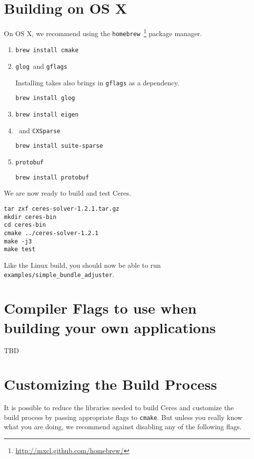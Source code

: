\section{Building on OS X}
On OS X, we recommend using the \texttt{homebrew}~\footnote{\url{http://mxcl.github.com/homebrew/}} package manager.

\begin{enumerate}
\item{\cmake}
\begin{verbatim}
brew install cmake
\end{verbatim}
\item{\texttt{glog}\ and \texttt{gflags}}

Installing \texttt{\glog} takes also brings in \texttt{gflags} as a dependency.
\begin{verbatim}
brew install glog
\end{verbatim}
\item{\eigen}
\begin{verbatim}
brew install eigen
\end{verbatim}
\item{\suitesparse\ and \texttt{CXSparse}}
\begin{verbatim}
brew install suite-sparse
\end{verbatim}
\item{\texttt{protobuf}}
\begin{verbatim}
brew install protobuf
\end{verbatim}
\end{enumerate}

We are now ready to build and test Ceres.
\begin{verbatim}
tar zxf ceres-solver-1.2.1.tar.gz
mkdir ceres-bin
cd ceres-bin
cmake ../ceres-solver-1.2.1
make -j3
make test
\end{verbatim}
Like the Linux build, you should now be able to run \texttt{examples/simple\_bundle\_adjuster}.


\section{Compiler Flags to use when building your own applications}
\label{sec:compiler-flags}
TBD


\section{Customizing the Build Process}
\label{sec:custom}
It is possible to reduce the libraries needed to build Ceres and
customize the build process by passing appropriate flags to \texttt{cmake}. But unless you really know what you are
doing, we recommend against disabling any of the following flags.

